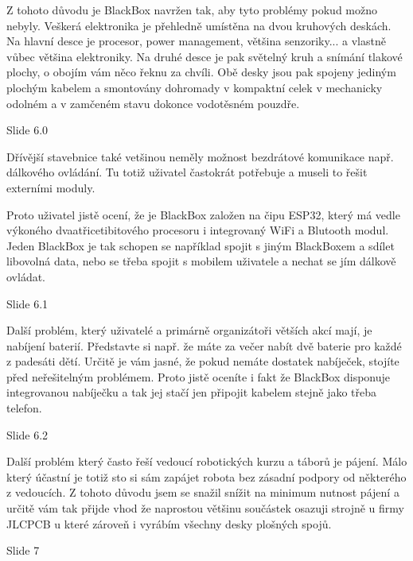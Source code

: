 Z tohoto důvodu je BlackBox navržen tak, aby tyto problémy pokud možno nebyly. 
Veškerá elektronika je přehledně umístěna na dvou kruhových deskách.
Na hlavní desce je procesor, power management, většina
senzoriky... a vlastně vůbec většina elektroniky. Na druhé desce je pak světelný kruh a snímání tlakové plochy, 
o obojím vám něco řeknu za chvíli.
Obě desky jsou pak spojeny jediným plochým kabelem a smontovány dohromady v kompaktní celek 
v mechanicky odolném a v zamčeném stavu dokonce vodotěsném pouzdře. %


Slide 6.0

Dřívější stavebnice také vetšinou neměly možnost bezdrátové komunikace např. dálkového ovládání.
Tu totiž uživatel častokrát potřebuje a museli to řešit externími moduly.

Proto uživatel jistě ocení, že je BlackBox založen na čipu ESP32, 
který má vedle výkoného dvaatřicetibitového procesoru i integrovaný WiFi a Blutooth modul. 
Jeden BlackBox je tak schopen se například spojit s jiným BlackBoxem a sdílet libovolná data, 
nebo se třeba spojit s mobilem uživatele a nechat se jím dálkově ovládat. %

Slide 6.1

Další problém, který uživatelé a primárně organizátoři větších akcí mají, je nabíjení baterií. 
Představte si např. že máte za večer nabít dvě baterie pro každé z padesáti dětí. Určitě je vám jasné, že pokud 
nemáte dostatek nabíječek, stojíte před neřešitelným problémem.
Proto jistě oceníte i fakt že BlackBox disponuje integrovanou nabíječku a tak jej stačí 
jen připojit kabelem stejně jako třeba telefon.

Slide 6.2

Další problém který často řeší vedoucí robotických kurzu a táborů je pájení. Málo který účastní 
je totiž sto si sám zapájet robota bez zásadní podpory od některého z vedoucích. Z tohoto důvodu jsem 
se snažil snížit na minimum nutnost pájení a určitě vám tak přijde vhod že naprostou většinu součástek 
osazuji strojně u firmy JLCPCB u které zároveň i vyrábím všechny desky plošných spojů. %

Slide 7

